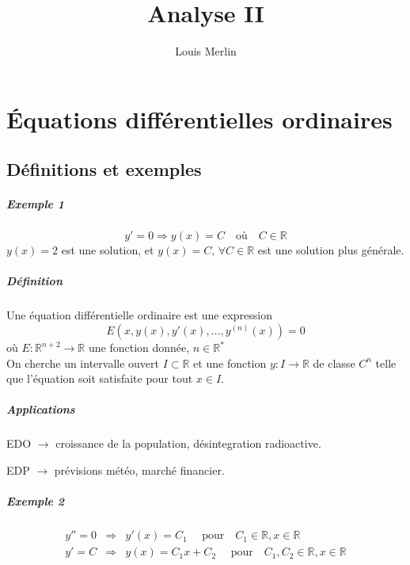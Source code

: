 \documentclass[1Opt]{report}
\author{Louis Merlin}
\begin{document}
\title{Analyse II}
\maketitle

\tableofcontents


\chapter{Équations différentielles ordinaires}

\section{Définitions et exemples}


\paragraph{Exemple 1}
\[y'=0 \Rightarrow y(x)=C \quad \mbox{où} \quad C\in{\mathbb R}\]
$y(x)=2$ est une solution, et $y(x)=C,\,\forall C\in{\mathbb R}$ est une solution
plus générale.

\paragraph{Définition}
Une équation différentielle ordinaire est une expression
\[ E(x,y(x),y'(x),\ldots,y^{(n)}(x))=0\]
où $E:{\mathbb R}^{n+2}\rightarrow{\mathbb R}$ une fonction donnée,
$n\in{\mathbb R}^\ast$\\
On cherche un intervalle ouvert $I\subset{\mathbb R}$ et une fonction
$y:I\rightarrow{\mathbb R}$ de classe $C^n$ telle que l'équation soit satisfaite
pour tout $x\in I$.

\paragraph{Applications}
\begin{description}
  \item EDO $\rightarrow$ croissance de la population, désintegration radioactive.
  \item EDP $\rightarrow$ prévisions météo, marché financier.
\end{description}

\paragraph{Exemple 2}
\begin{eqnarray*}
   y''=0 & \Rightarrow & y'(x)=C_1\quad \mbox{ pour} \quad C_1\in{\mathbb R}, x\in{\mathbb R} \\
   y'=C & \Rightarrow & y(x)=C_1x+C_2\quad \mbox{ pour} \quad C_1,C_2\in{\mathbb R},x\in{\mathbb R}
\end{eqnarray*}
\end{document}
